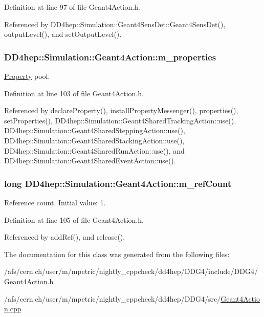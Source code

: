 Definition at line 97 of file Geant4Action.h.

Referenced by DD4hep::Simulation::Geant4SensDet::Geant4SensDet(), outputLevel(), and setOutputLevel().\hypertarget{class_d_d4hep_1_1_simulation_1_1_geant4_action_a30ee75af74df39aa7b34946c59da17ba}{
\subsubsection[{m\_\-properties}]{ {\bf DD4hep::Simulation::Geant4Action::m\_\-properties}}}
\label{class_d_d4hep_1_1_simulation_1_1_geant4_action_a30ee75af74df39aa7b34946c59da17ba}


\hyperlink{class_d_d4hep_1_1_property}{Property} pool. 

Definition at line 103 of file Geant4Action.h.

Referenced by declareProperty(), installPropertyMessenger(), properties(), setProperties(), DD4hep::Simulation::Geant4SharedTrackingAction::use(), DD4hep::Simulation::Geant4SharedSteppingAction::use(), DD4hep::Simulation::Geant4SharedStackingAction::use(), DD4hep::Simulation::Geant4SharedRunAction::use(), and DD4hep::Simulation::Geant4SharedEventAction::use().\hypertarget{class_d_d4hep_1_1_simulation_1_1_geant4_action_a5ea9f95e6db274a1515b947b4f69da9e}{
\subsubsection[{m\_\-refCount}]{\setlength{\rightskip}{0pt plus 5cm}long {\bf DD4hep::Simulation::Geant4Action::m\_\-refCount}}}
\label{class_d_d4hep_1_1_simulation_1_1_geant4_action_a5ea9f95e6db274a1515b947b4f69da9e}


Reference count. Initial value: 1. 

Definition at line 105 of file Geant4Action.h.

Referenced by addRef(), and release().

The documentation for this class was generated from the following files:\begin{DoxyCompactItemize}
\item 
/afs/cern.ch/user/m/mpetric/nightly\_\-cppcheck/dd4hep/DDG4/include/DDG4/\hyperlink{_geant4_action_8h}{Geant4Action.h}\item 
/afs/cern.ch/user/m/mpetric/nightly\_\-cppcheck/dd4hep/DDG4/src/\hyperlink{_geant4_action_8cpp}{Geant4Action.cpp}\end{DoxyCompactItemize}

